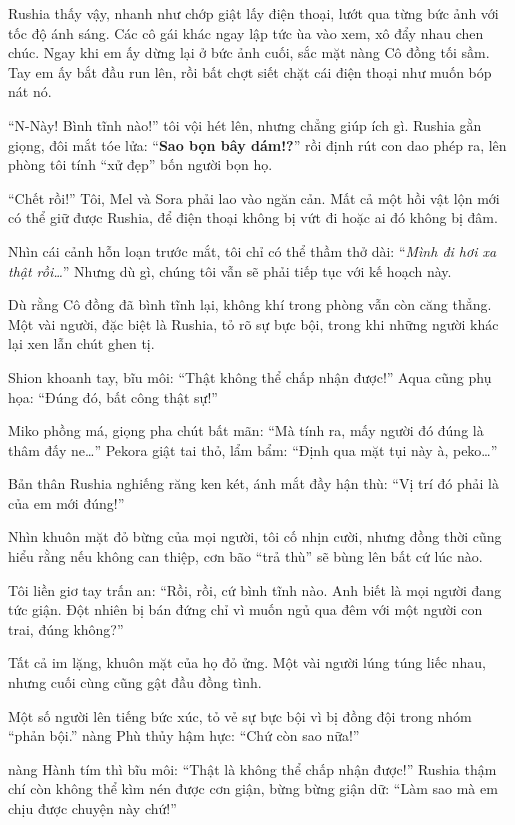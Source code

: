 \documentclass[../main.tex]{subfiles}
\begin{document}
Rushia thấy vậy, nhanh như chớp giật lấy điện thoại, lướt qua từng bức ảnh với tốc độ ánh sáng. Các cô gái khác ngay lập tức ùa vào xem, xô đẩy nhau chen chúc. Ngay khi em ấy dừng lại ở bức ảnh cuối, sắc mặt nàng Cô đồng tối sầm. Tay em ấy bắt đầu run lên, rồi bất chợt siết chặt cái điện thoại như muốn bóp nát nó.

``N-Này! Bình tĩnh nào!'' tôi vội hét lên, nhưng chẳng giúp ích gì. Rushia gằn giọng, đôi mắt tóe lửa: ``\textbf{Sao bọn bây dám!?}'' rồi định rút con dao phép ra, lên phòng tôi tính ``xử đẹp'' bốn người bọn họ.

``Chết rồi!'' Tôi, Mel và Sora phải lao vào ngăn cản. Mất cả một hồi vật lộn mới có thể giữ được Rushia, để điện thoại không bị vứt đi hoặc ai đó không bị đâm.

Nhìn cái cảnh hỗn loạn trước mắt, tôi chỉ có thể thầm thở dài: ``\textit{Mình đi hơi xa thật rồi\dots}'' Nhưng dù gì, chúng tôi vẫn sẽ phải tiếp tục với kế hoạch này.

\ct

Dù rằng Cô đồng đã bình tĩnh lại, không khí trong phòng vẫn còn căng thẳng. Một vài người, đặc biệt là Rushia, tỏ rõ sự bực bội, trong khi những người khác lại xen lẫn chút ghen tị.

Shion khoanh tay, bĩu môi: ``Thật không thể chấp nhận được!'' Aqua cũng phụ họa: ``Đúng đó, bất công thật sự!''

Miko phồng má, giọng pha chút bất mãn: ``Mà tính ra, mấy người đó đúng là thâm đấy ne\dots'' Pekora giật tai thỏ, lẩm bẩm: ``Định qua mặt tụi này à, peko\dots''

Bản thân Rushia nghiếng răng ken két, ánh mắt đầy hận thù: ``Vị trí đó phải là của em mới đúng!''

Nhìn khuôn mặt đỏ bừng của mọi người, tôi cố nhịn cười, nhưng đồng thời cũng hiểu rằng nếu không can thiệp, cơn bão ``trả thù'' sẽ bùng lên bất cứ lúc nào.

Tôi liền giơ tay trấn an: ``Rồi, rồi, cứ bình tĩnh nào. Anh biết là mọi người đang tức giận. Đột nhiên bị bán đứng chỉ vì muốn ngủ qua đêm với một người con trai, đúng không?''

Tất cả im lặng, khuôn mặt của họ đỏ ửng. Một vài người lúng túng liếc nhau, nhưng cuối cùng cũng gật đầu đồng tình.

Một số người lên tiếng bức xúc, tỏ vẻ sự bực bội vì bị đồng đội trong nhóm ``phản bội.'' nàng Phù thủy hậm hực: ``Chứ còn sao nữa!''

nàng Hành tím thì bĩu môi: ``Thật là không thể chấp nhận được!'' Rushia thậm chí còn không thể kìm nén được cơn giận, bừng bừng giận dữ: ``Làm sao mà em chịu được chuyện này chứ!''
\end{document}
